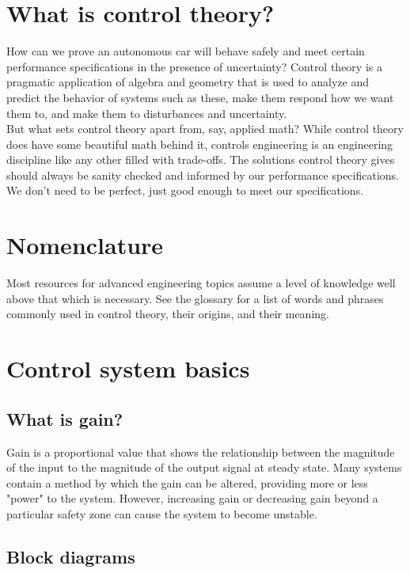 \section{What is control theory?}

How can we prove an autonomous car will behave safely and meet certain
performance specifications in the presence of uncertainty? Control theory is a
pragmatic application of algebra and geometry that is used to analyze and
predict the behavior of \glspl{system} such as these, make them respond how we
want them to, and make them  to \glspl{disturbance}
and uncertainty. \\

But what sets control theory apart from, say, applied math? While control theory
does have some beautiful math behind it, controls engineering is an engineering
discipline like any other filled with trade-offs. The solutions control theory
gives should always be sanity checked and informed by our performance
specifications. We don't need to be perfect, just good enough to meet our
specifications.

\section{Nomenclature}

Most resources for advanced engineering topics assume a level of knowledge well
above that which is necessary. See the glossary for a list of words and phrases
commonly used in control theory, their origins, and their meaning.

\section{Control system basics}

\subsection{What is gain?}

Gain is a proportional value that shows the relationship between the magnitude
of the input to the magnitude of the output signal at steady state. Many
\glspl{system} contain a method by which the gain can be altered, providing more
or less "power" to the \gls{system}. However, increasing gain or decreasing gain
beyond a particular safety zone can cause the \gls{system} to become unstable.

\subsection{Block diagrams}

